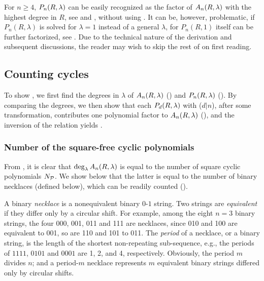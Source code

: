 \documentclass[twocolumn]{revtex4-1}
\begin{document}
For $n \ge 4$,
  $P_n(R, \lambda)$ can be easily recognized as
  the factor of $A_n(R, \lambda)$
  with the highest degree in $R$,
  see  and ,
  without using .
It can be, however, problematic,
   if $P_n(R, \lambda)$ is solved for $\lambda = 1$
   instead of a general $\lambda$,
   for $P_n(R, 1)$ itself can be further factorized,
  see .
%
Due to the technical nature of the derivation and subsequent discussions,
  the reader may wish to skip the rest of 
  on first reading.






\subsection{\label{sec:degprimfac}Counting cycles}


To show , we first find the degrees in $\lambda$ of
  $A_n(R, \lambda)$ () and $P_n(R, \lambda)$ ().
By comparing the degrees,
  we then show that each $P_d(R, \lambda)$ with ($d|n$),
  after some transformation,
  contributes one polynomial factor to $A_n(R, \lambda)$
  (),
  and the inversion of the relation
  yields .


\subsubsection{Number of the square-free cyclic polynomials}


From , it is clear that $\deg_\lambda A_n(R, \lambda)$
  is equal to the number of square cyclic polynomials $N_\mathcal P$.
We show below that the latter
  is equal to the number of binary necklaces (defined below),
  which can be readily counted ().

A binary \emph{necklace}
  is a nonequivalent binary $0$-$1$ string.
%
Two strings are \emph{equivalent} if they differ only by a circular shift.
%
For example, among the eight $n=3$ binary strings,
the four 000, 001, 011 and 111 are necklaces,
since 010 and 100 are equivalent to 001,
so are 110 and 101 to 011.
%
The \emph{period} of a necklace, or a binary string,
  is the length of the shortest non-repeating sub-sequence,
  e.g., the periods of $1111$, $0101$ and $0001$
        are 1, 2, and 4, respectively.
%
Obviously, the period $m$ divides $n$;
  and a period-$m$ necklace
  represents $m$ equivalent binary strings
  differed only by circular shifts.
\end{document}
